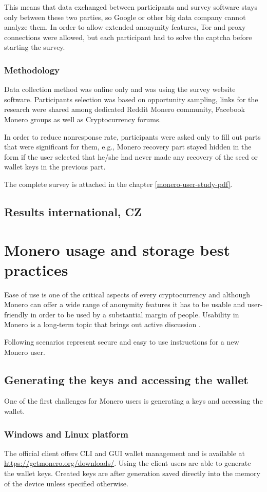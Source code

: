 \documentclass[
  printed, %
  table,   %
  nolof,     %
  nolot,     %
           oneside, color
]{fithesis3}
\begin{document}
This means that data exchanged between participants and survey software stays only between these two parties, so Google or other big data company cannot analyze them. In order to allow extended anonymity features, Tor and proxy connections were allowed, but each participant had to solve the captcha before starting the survey.
\subsection{Methodology}
Data collection method was online only and was using the survey website software. Participants selection was based on opportunity sampling, links for the research were shared among dedicated Reddit Monero community, Facebook Monero groups as well as Cryptocurrency forums.

In order to reduce nonresponse rate, participants were asked only to fill out parts that were significant for them, e.g., Monero recovery part stayed hidden in the form if the user selected that he/she had never made any recovery of the seed or wallet keys in the previous part. 

The complete survey is attached in the chapter \ref{monero-user-study-pdf}.


\section{Results international, CZ}

\chapter{Monero usage and storage best practices}
Ease of use is one of the critical aspects of every cryptocurrency and although Monero can offer a wide range of anonymity features it has to be usable and user-friendly in order to be used by a substantial margin of people. Usability in Monero is a long-term topic that brings out active discussion \cite{monerolang2018}.

Following scenarios represent secure and easy to use instructions for a new Monero user.

\section{Generating the keys and accessing the wallet}
One of the first challenges for Monero users is generating a keys and accessing the wallet.
\subsection{Windows and Linux platform}
The official client offers CLI and GUI wallet management and is available at \url{https://getmonero.org/downloads/}. Using the client users are able to generate the wallet keys. Created keys are after generation saved directly into the memory of the device unless specified otherwise. 
\end{document}
